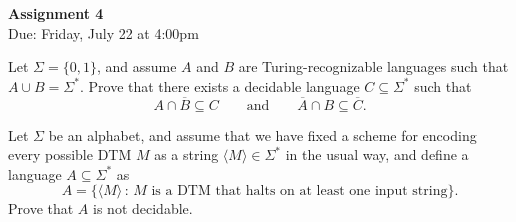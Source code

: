 \documentclass[11pt]{article}
\newenvironment{mylist}[1]{\begin{list}{}{
	\setlength{\leftmargin}{#1}
	\setlength{\rightmargin}{0mm}
	\setlength{\labelsep}{2mm}
	\setlength{\labelwidth}{8mm}
	\setlength{\itemsep}{0mm}}}
	{\end{list}}
\newcounter{questioncounter}
\newenvironment{question}{
  \begin{mylist}{\parindent}
  \item[\stepcounter{questioncounter}
    \thequestioncounter.]}{
\end{mylist}}
\begin{document}
\pagestyle{plain}
\thispagestyle{fancy}
\cfoot{\thepage} 
\renewcommand{\headrulewidth}{0pt}
\renewcommand{\footrulewidth}{0pt}

\begin{center}
  \rule{0mm}{9mm}
  {\Large\bf Assignment 4}\\[2mm]
  Due: Friday, July 22 at 4:00pm
\end{center}


\begin{question}[4 points]
  Let $\Sigma = \{0,1\}$, and assume $A$ and $B$ are Turing-recognizable
  languages such that $A\cup B = \Sigma^{\ast}$.
  Prove that there exists a decidable language $C\subseteq\Sigma^{\ast}$ such
  that
  \[
  A\cap \overline{B} \subseteq C
  \qquad\text{and}\qquad
  \overline{A}\cap B \subseteq \overline{C}.
  \]
\end{question}


\begin{question}[4 points]
  Let $\Sigma$ be an alphabet, and assume that we have fixed a scheme for
  encoding every possible DTM $M$ as a string 
  $\langle M\rangle\in\Sigma^{\ast}$ in the usual way, and define a language
  $A\subseteq\Sigma^{\ast}$ as
  \[
  A = \bigl\{
  \langle M \rangle \,:\,
  \text{$M$ is a DTM that halts on at least one input string}\bigr\}.
  \]
  Prove that $A$ is not decidable.
\end{question}

\end{document}
